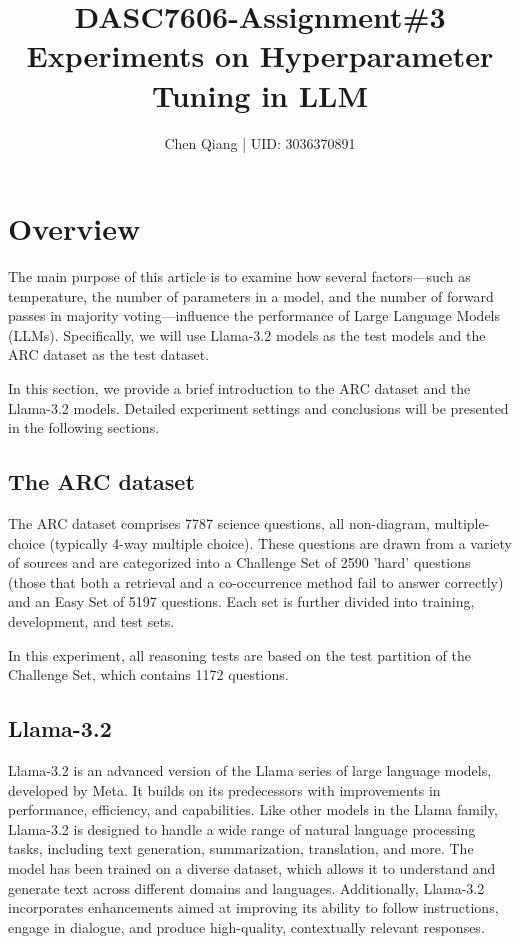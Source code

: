 \documentclass[
	a4paper, %
	10pt, %
	twoside, %
]{LTJournalArticle}
\title{DASC7606-Assignment\#3\\Experiments on Hyperparameter Tuning in LLM} %
\author{Chen Qiang | UID: 3036370891}
\begin{document}
\maketitle %


\section{Overview}

The main purpose of this article is to examine how several factors—such as temperature, the number of parameters in a model, and the number of forward passes in majority voting—influence the performance of Large Language Models (LLMs). Specifically, we will use Llama-3.2 models as the test models and the ARC dataset as the test dataset.

In this section, we provide a brief introduction to the ARC dataset\autocite{clark2018thinksolvedquestionanswering} and the Llama-3.2 models\autocite{dubey2024llama3herdmodels}. Detailed experiment settings and conclusions will be presented in the following sections.

\subsection{The ARC dataset}

The ARC dataset\autocite{clark2018thinksolvedquestionanswering} comprises 7787 science questions, all non-diagram, multiple-choice (typically 4-way multiple choice). These questions are drawn from a variety of sources and are categorized into a Challenge Set of 2590 'hard' questions (those that both a retrieval and a co-occurrence method fail to answer correctly) and an Easy Set of 5197 questions. Each set is further divided into training, development, and test sets.

In this experiment, all reasoning tests are based on the test partition of the Challenge Set, which contains 1172 questions.

\subsection{Llama-3.2}

Llama-3.2\autocite{dubey2024llama3herdmodels} is an advanced version of the Llama series of large language models, developed by Meta. It builds on its predecessors with improvements in performance, efficiency, and capabilities. Like other models in the Llama family, Llama-3.2 is designed to handle a wide range of natural language processing tasks, including text generation, summarization, translation, and more. The model has been trained on a diverse dataset, which allows it to understand and generate text across different domains and languages. Additionally, Llama-3.2 incorporates enhancements aimed at improving its ability to follow instructions, engage in dialogue, and produce high-quality, contextually relevant responses.
\end{document}
